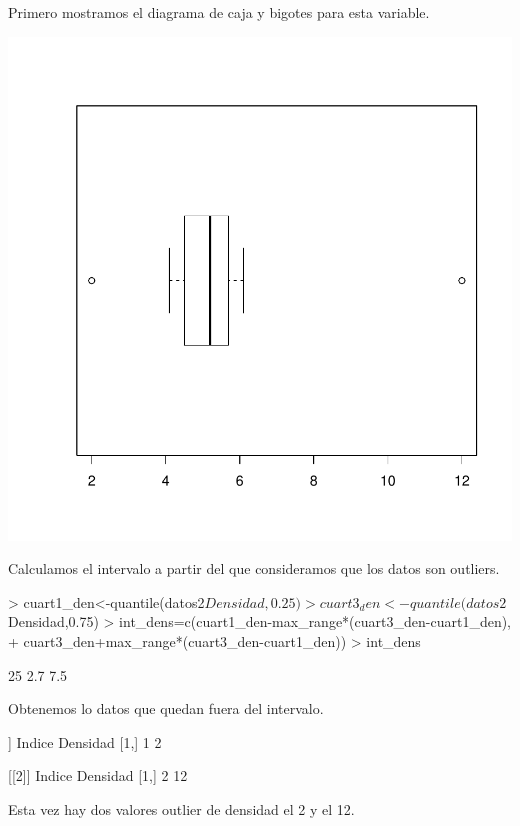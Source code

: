 \documentclass [a4paper] {article}
\begin{document}
Primero mostramos el diagrama de caja y bigotes para esta variable.
\begin{center}
\includegraphics{entrega-plot_caja_bigotes}
\end{center}

Calculamos el intervalo a partir del que consideramos que los datos son outliers.
\begin{Schunk}
\begin{Sinput}
> cuart1_den<-quantile(datos2$Densidad,0.25)
> cuart3_den<-quantile(datos2$Densidad,0.75)
> int_dens=c(cuart1_den-max_range*(cuart3_den-cuart1_den), 
+            cuart3_den+max_range*(cuart3_den-cuart1_den))
> int_dens
\end{Sinput}
\begin{Soutput}
25%
2.7 7.5 
\end{Soutput}
\end{Schunk}

Obtenemos lo datos que quedan fuera del intervalo.
\begin{Schunk}
\begin{Soutput}
[[1]]
     Indice Densidad
[1,]      1        2

[[2]]
     Indice Densidad
[1,]      2       12
\end{Soutput}
\end{Schunk}
Esta vez hay dos valores outlier de densidad el 2 y el 12.
\end{document}
